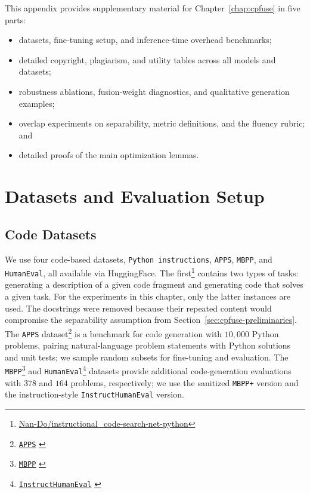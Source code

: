 

\begin{tcolorbox}[
  enhanced,
  breakable,
  colback=gray!6,
  colframe=chaptercolor,
  boxrule=0.8pt,
  arc=3pt,
  title={Guide to Appendix~\ref{chap:appendix-cpfuse}},
  colbacktitle=chaptercolor!12,
  coltitle=black
]
This appendix provides supplementary material for Chapter~\ref{chap:cpfuse} in five parts:
\begin{itemize}
    \item datasets, fine-tuning setup, and inference-time overhead benchmarks;
    \item detailed copyright, plagiarism, and utility tables across all models and datasets;
    \item robustness ablations, fusion-weight diagnostics, and qualitative generation examples;
    \item overlap experiments on separability, metric definitions, and the fluency rubric; and
    \item detailed proofs of the main optimization lemmas.
\end{itemize}
\end{tcolorbox}

\section{Datasets and Evaluation Setup}
\label{app:cpfuse-datasets}

\subsection{Code Datasets}

We use four code-based datasets, \texttt{Python instructions}, \texttt{APPS}, \texttt{MBPP}, and \texttt{HumanEval}, all available via HuggingFace. The first\footnote{\href{https://huggingface.co/datasets/Nan-Do/instructional_code-search-net-python?row=0}{Nan-Do/instructional\_code-search-net-python}} contains two types of tasks: generating a description of a given code fragment and generating code that solves a given task. For the experiments in this chapter, only the latter instances are used. The docstrings were removed because their repeated content would compromise the separability assumption from Section~\ref{sec:cpfuse-preliminaries}. The \texttt{APPS} dataset\footnote{\href{https://huggingface.co/datasets/codeparrot/apps}{\texttt{APPS}} \citep{hendrycksapps2021}} is a benchmark for code generation with \(10{,}000\) Python problems, pairing natural-language problem statements with Python solutions and unit tests; we sample random subsets for fine-tuning and evaluation. The \texttt{MBPP}\footnote{\href{https://huggingface.co/datasets/google-research-datasets/mbpp}{\texttt{MBPP}} \citep{austin2021program}} and \texttt{HumanEval}\footnote{\href{https://huggingface.co/datasets/codeparrot/instructhumaneval}{\texttt{InstructHumanEval}} \citep{chen2021evaluating}} datasets provide additional code-generation evaluations with \(378\) and \(164\) problems, respectively; we use the sanitized \texttt{MBPP+} version and the instruction-style \texttt{InstructHumanEval} version.

